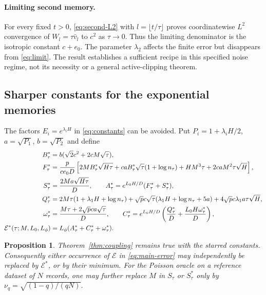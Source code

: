 \documentclass[a4paper,11pt]{article}
\newtheorem{proposition}[theorem]{Proposition}
\theoremstyle{remark}
\begin{document}
\paragraph{Limiting second memory.}
For every fixed $t>0$, \eqref{eq:second-L2} with
$l=\lfloor t/\tau\rfloor$ proves coordinatewise $L^2$ convergence of
$W_l=\tau\widehat v_l$ to $c^2$ as $\tau\to0$.
Thus the limiting denominator is the isotropic constant $c+e_0$.
The parameter $\lambda_2$ affects the finite error but disappears from
\eqref{eq:limit}. The result establishes a sufficient recipe in this
specified noise regime, not its necessity or a general active-clipping theorem.

\subsection{Sharper constants for the exponential memories}\label{sec:sharp}

The factors $E_i=e^{\lambda_iH}$ in \eqref{eq:constants} can be avoided.
Put $P_i=1+\lambda_iH/2$, $a=\sqrt{P_1}$, $b=\sqrt{P_2}$ and define
\begin{align}
 B_\tau^*&=b(\sqrt2c^2+2cM\sqrt\tau),\notag\\
 F_\tau^*&=\frac p{ce_0D}\left[
 2MB_\tau^*\sqrt{H\tau}
 +caB_\tau^*\sqrt\tau(1+\log n_\tau)
 +HM^3\tau+2caM^2\tau\sqrt H\right],\notag\\
 S_\tau^*&=\frac{2Ma\sqrt{H\tau}}D,\qquad
 A_\tau^*=e^{L_0H/D}(F_\tau^*+S_\tau^*),\notag\\
 Q_\tau^*&=2M\tau(1+\lambda_1H+\log n_\tau)
 +\sqrt p c\sqrt\tau(\lambda_1H+\log n_\tau+5a)
 +4\sqrt p c\lambda_1a\tau\sqrt H,\notag\\
 \omega_\tau^*&=\frac{M\tau+2\sqrt p ca\sqrt\tau}D,\qquad
 C_\tau^*=e^{L_0H/D}\left(\frac{Q_\tau^*}D+
                                     \frac{L_0H\omega_\tau^*}D\right),\notag\\
 \mathcal E^*(\tau;M,L_0,L_\phi)&=L_\phi(A_\tau^*+C_\tau^*+\omega_\tau^*).
 \label{eq:sharp-constants}
\end{align}

\begin{proposition}\label{prop:sharp}
Theorem~\ref{thm:coupling} remains true with the starred constants.
Consequently either occurrence of $\mathcal E$ in \eqref{eq:main-error}
may independently be replaced by $\mathcal E^*$, or by their minimum.
For the Poisson oracle on a reference dataset of $N$ records, one may further
replace $M$ in $S_\tau$ or $S_\tau^*$ only by
$\nu_q=\sqrt{(1-q)/(qN)}$.
\end{proposition}
\end{document}
